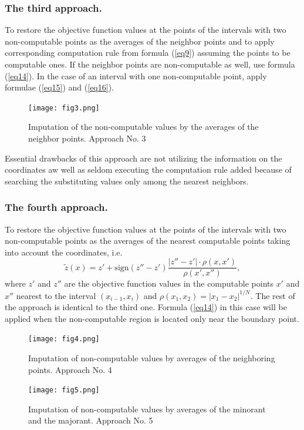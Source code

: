 \documentclass[runningheads]{llncs}
\begin{document}
\subsubsection{The third approach.} To restore the objective function values at the points of the intervals with two non-computable points as the averages of the neighbor points and to apply corresponding computation rule from formula (\ref{eq9}) assuming the points to be computable ones. If the neighbor points are non-computable as well, use formula (\ref{eq14}). In the case of an interval with one non-computable point, apply formulae (\ref{eq15}) and (\ref{eq16}).
\begin{figure}
\centering
\texttt{[image: fig3.png]}
\caption{Imputation of the non-computable values by the averages of the neighbor points. Approach No. 3} \label{fig3}
\end{figure}

Essential drawbacks of this approach are not utilizing the information on the coordinates aw well as seldom executing the computation rule added because of searching the substituting values only among the nearest neighbors.

\subsubsection{The fourth approach.} To restore the objective function values at the points of the intervals with two non-computable points as the averages of the nearest computable points taking into account the coordinates, i.e.
\begin{equation}\label{eq17} 
\tilde{z}(x)=z'+ \text{sign}(z''-z') \frac {|z''-z'| \cdot \rho(x,x')}{\rho(x',x'') },
\end{equation}
where $z'$ and $z''$ are the objective function values in the computable points $x'$ and $x''$  nearest to the interval $(x_{i-1},x_i)$ and $\rho(x_1,x_2) =  |x_1 - x_2|^{1/N}$.
The rest of the approach is identical to the third one. Formula (\ref{eq14}) in this case will be applied when the non-computable region is located only near the boundary point.
\begin{figure}
\centering
\texttt{[image: fig4.png]}
\caption{Imputation of non-computable values by averages of the neighboring points. Approach No. 4} \label{fig4}
\end{figure}
\begin{figure}
\centering
\texttt{[image: fig5.png]}
\caption{Imputation of non-computable values by averages of the minorant and the majorant. Approach No. 5} \label{fig5}
\end{figure}
\end{document}
